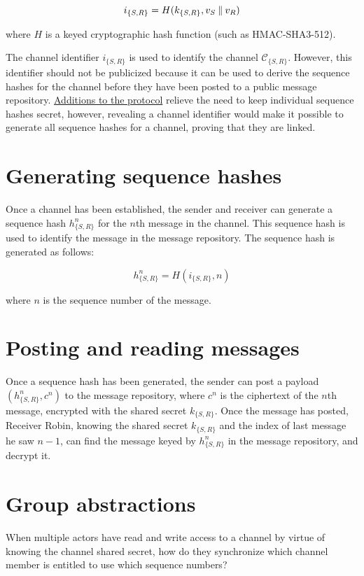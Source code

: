 $$ i_{\{S,R\}} = H(k_{\{S,R\}}, v_S \mathbin{\|} v_R) $$

where $H$ is a keyed cryptographic hash function (such as HMAC-SHA3-512).

The channel identifier $i_{\{S,R\}}$ is used to identify the channel $\mathcal{C}_{\{S,R\}}$. However, this identifier should not be publicized because it can be used to derive the sequence hashes for the channel before they have been posted to a public message repository. \hyperref[ensuring-proxy-honesty]{Additions to the protocol} relieve the need to keep individual sequence hashes secret, however, revealing a channel identifier would make it possible to generate all sequence hashes for a channel, proving that they are linked.

\section{Generating sequence hashes}\label{generating-sequence-hashes}

Once a channel has been established, the sender and receiver can generate a sequence hash $h_{\{S,R\}}^n$ for the $n$th message in the channel. This sequence hash is used to identify the message in the message repository. The sequence hash is generated as follows:

$$ h_{\{S,R\}}^n = H(i_{\{S,R\}}, n) $$

where $n$ is the sequence number of the message.

\section{Posting and reading messages}\label{posting-and-reading-messages}

Once a sequence hash has been generated, the sender can post a payload $(h_{\{S,R\}}^n, c^n)$ to the message repository, where $c^n$ is the ciphertext of the $n$th message, encrypted with the shared secret $k_{\{S,R\}}$. Once the message has posted, Receiver Robin, knowing the shared secret $k_{\{S,R\}}$ and the index of last message he saw $n-1$, can find the message keyed by $h_{\{S,R\}}^n$ in the message repository, and decrypt it.

\section{Group abstractions}\label{group-abstractions}

When multiple actors have read and write access to a channel by virtue of knowing the channel shared secret, how do they synchronize which channel member is entitled to use which sequence numbers?

